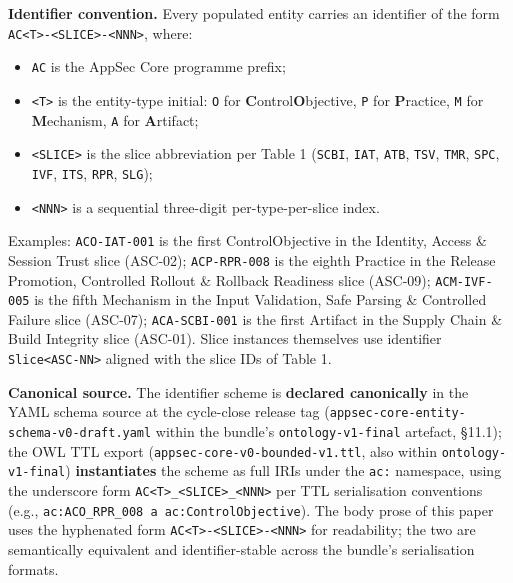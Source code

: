 \documentclass[
]{article}
\providecommand{\tightlist}{%
  \setlength{\itemsep}{0pt}\setlength{\parskip}{0pt}}
\begin{document}
\textbf{Identifier convention.} Every populated entity carries an
identifier of the form
\texttt{AC\textless{}T\textgreater{}-\textless{}SLICE\textgreater{}-\textless{}NNN\textgreater{}},
where:

\begin{itemize}
\tightlist
\item
  \texttt{AC} is the AppSec Core programme prefix;
\item
  \texttt{\textless{}T\textgreater{}} is the entity-type initial:
  \texttt{O} for \textbf{C}ontrol\textbf{O}bjective, \texttt{P} for
  \textbf{P}ractice, \texttt{M} for \textbf{M}echanism, \texttt{A} for
  \textbf{A}rtifact;
\item
  \texttt{\textless{}SLICE\textgreater{}} is the slice abbreviation per
  Table 1 (\texttt{SCBI}, \texttt{IAT}, \texttt{ATB}, \texttt{TSV},
  \texttt{TMR}, \texttt{SPC}, \texttt{IVF}, \texttt{ITS}, \texttt{RPR},
  \texttt{SLG});
\item
  \texttt{\textless{}NNN\textgreater{}} is a sequential three-digit
  per-type-per-slice index.
\end{itemize}

Examples: \texttt{ACO-IAT-001} is the first ControlObjective in the
Identity, Access \& Session Trust slice (ASC-02); \texttt{ACP-RPR-008}
is the eighth Practice in the Release Promotion, Controlled Rollout \&
Rollback Readiness slice (ASC-09); \texttt{ACM-IVF-005} is the fifth
Mechanism in the Input Validation, Safe Parsing \& Controlled Failure
slice (ASC-07); \texttt{ACA-SCBI-001} is the first Artifact in the
Supply Chain \& Build Integrity slice (ASC-01). Slice instances
themselves use identifier \texttt{Slice\textless{}ASC-NN\textgreater{}}
aligned with the slice IDs of Table 1.

\textbf{Canonical source.} The identifier scheme is \textbf{declared
canonically} in the YAML schema source at the cycle-close release tag
(\texttt{appsec-core-entity-schema-v0-draft.yaml} within the bundle's
\texttt{ontology-v1-final} artefact, §11.1); the OWL TTL export
(\texttt{appsec-core-v0-bounded-v1.ttl}, also within
\texttt{ontology-v1-final}) \textbf{instantiates} the scheme as full
IRIs under the \texttt{ac:} namespace, using the underscore form
\texttt{AC\textless{}T\textgreater{}\_\textless{}SLICE\textgreater{}\_\textless{}NNN\textgreater{}}
per TTL serialisation conventions (e.g.,
\texttt{ac:ACO\_RPR\_008\ a\ ac:ControlObjective}). The body prose of
this paper uses the hyphenated form
\texttt{AC\textless{}T\textgreater{}-\textless{}SLICE\textgreater{}-\textless{}NNN\textgreater{}}
for readability; the two are semantically equivalent and
identifier-stable across the bundle's serialisation formats.
\end{document}
